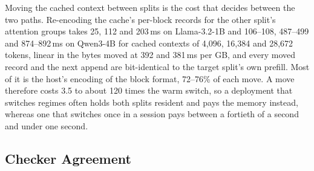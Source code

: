 Moving the cached context between splits is the cost that decides between the two paths.
Re-encoding the cache's per-block records for the other split's attention groups takes 25, 112 and 203\,ms on Llama-3.2-1B and 106--108, 487--499 and 874--892\,ms on Qwen3-4B for cached contexts of 4{,}096, 16{,}384 and 28{,}672 tokens, linear in the bytes moved at 392 and 381\,ms per GB, and every moved record and the next append are bit-identical to the target split's own prefill.
Most of it is the host's encoding of the block format, 72--76\% of each move.
A move therefore costs 3.5 to about 120 times the warm switch, so a deployment that switches regimes often holds both splits resident and pays the memory instead, whereas one that switches once in a session pays between a fortieth of a second and under one second.

\subsection{Checker Agreement}
\label{app:checkers}

